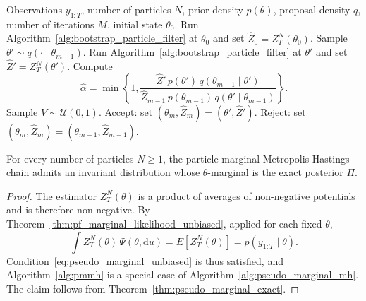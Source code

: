 \begin{algorithm}[H]
\caption{Particle marginal Metropolis-Hastings}
\label{alg:pmmh}
\begin{algorithmic}[1]
    \REQUIRE Observations $y_{1:T}$, number of particles $N$, prior density $p(\theta)$, proposal density $q$, number of iterations $M$, initial state $\theta_0$.
    \STATE Run Algorithm~\ref{alg:bootstrap_particle_filter} at $\theta_0$ and set $\hat{Z}_0 = Z_T^N(\theta_0)$.
        \STATE Sample $\theta'\sim q(\cdot\mid\theta_{m-1})$.
        \STATE Run Algorithm~\ref{alg:bootstrap_particle_filter} at $\theta'$ and set $\hat{Z}' = Z_T^N(\theta')$.
        \STATE Compute
        \begin{equation*}
            \hat{\alpha} = \min\left\{1,\frac{\hat{Z}'\,p(\theta')\,q(\theta_{m-1}\mid\theta')}{\hat{Z}_{m-1}\,p(\theta_{m-1})\,q(\theta'\mid\theta_{m-1})}\right\}.
        \end{equation*}
        \STATE Sample $V\sim\mathcal{U}(0,1)$.
            \STATE Accept: set $(\theta_m,\hat{Z}_m) = (\theta',\hat{Z}')$.
        \ELSE
            \STATE Reject: set $(\theta_m,\hat{Z}_m) = (\theta_{m-1},\hat{Z}_{m-1})$.
        \ENDIF
    \ENDFOR
\end{algorithmic}
\end{algorithm}

\begin{theorem}
    \label{thm:pmmh_exact}
    For every number of particles $N\ge1$, the particle marginal Metropolis-Hastings chain admits an invariant distribution whose $\theta$-marginal is the exact posterior $\Pi$.
\end{theorem}
\begin{proof}
    The estimator $Z_T^N(\theta)$ is a product of averages of non-negative potentials and is therefore non-negative. By Theorem~\ref{thm:pf_marginal_likelihood_unbiased}, applied for each fixed $\theta$,
    \begin{equation}
        \int Z_T^N(\theta)\,\Psi(\theta,\mathrm{d}u) = E\left[Z_T^N(\theta)\right] = p(y_{1:T}\mid\theta).
    \end{equation}
    Condition~\eqref{eq:pseudo_marginal_unbiased} is thus satisfied, and Algorithm~\ref{alg:pmmh} is a special case of Algorithm~\ref{alg:pseudo_marginal_mh}. The claim follows from Theorem~\ref{thm:pseudo_marginal_exact}.
\end{proof}

